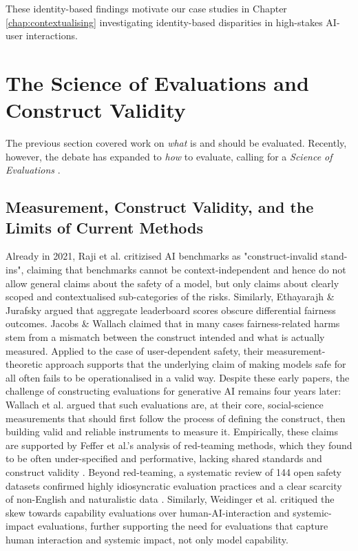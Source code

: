These identity-based findings motivate our case studies in Chapter \ref{chap:contextualising} investigating identity-based disparities in high-stakes AI-user interactions.









\section{The Science of Evaluations and Construct Validity}


The previous section covered work on \textit{what} is and should be evaluated. Recently, however, the debate has expanded to \textit{how} to evaluate, calling for a \textit{Science of Evaluations} \cite{weidinger2025evaluationscience}.


\subsection{Measurement, Construct Validity, and the Limits of Current Methods}


Already in 2021, Raji et al. \cite{raji2021everything} critizised AI benchmarks as "construct-invalid stand-ins", claiming that benchmarks cannot be context-independent and hence do not allow general claims about the safety of a model, but only claims about clearly scoped and contextualised sub-categories of the risks. Similarly, Ethayarajh \& Jurafsky \cite{ethayarajh-jurafsky-2020-utility} argued that aggregate leaderboard scores obscure differential fairness outcomes.
Jacobs \& Wallach \cite{jacobs2021measurement} claimed that in many cases fairness-related harms stem from a mismatch between the construct intended and what is actually measured. Applied to the case of user-dependent safety, their measurement-theoretic approach supports that the underlying claim of making models safe for all often fails to be operationalised in a valid way. Despite these early papers, the challenge of constructing evaluations for generative AI remains four years later: Wallach et al. \cite{wallach2025position} argued that such evaluations are, at their core, social-science measurements that should first follow the process of defining the construct, then building valid and reliable instruments to measure it. Empirically, these claims are supported by Feffer et al.'s analysis of red-teaming methods, which they found to be often under-specified and performative, lacking shared standards and construct validity \cite{feffer2024redteaming}. Beyond red-teaming, a systematic review of 144 open safety datasets confirmed highly idiosyncratic evaluation practices and a clear scarcity of non-English and naturalistic data \cite{rottger2025safetyprompts, grey2025safetymeasurementsystematicliterature}. Similarly, Weidinger et al. \cite{Weidinger2023SociotechnicalSE} critiqued the skew towards capability evaluations over human-AI-interaction and systemic-impact evaluations, further supporting the need for evaluations that capture human interaction and systemic impact, not only model capability.






